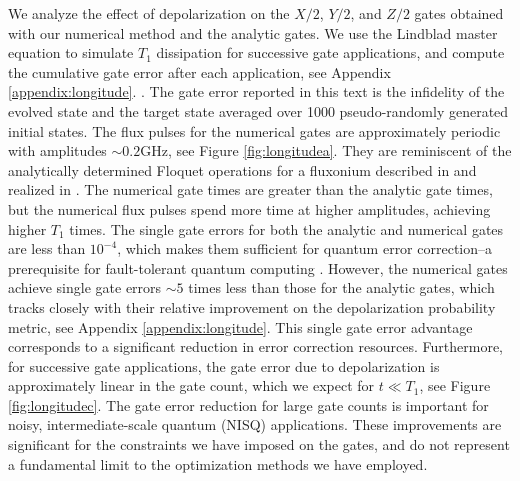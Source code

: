 We analyze the effect of depolarization on
the $X/2$, $Y/2$, and $Z/2$ gates obtained with
our numerical method and the analytic gates. We
use the Lindblad master equation to simulate $T_{1}$ dissipation for successive
gate applications, and compute the cumulative gate error
after each application, see Appendix \ref{appendix:longitude}.
.
The gate error reported in this text is the infidelity
of the evolved state and the target state averaged over 1000 pseudo-randomly
generated initial states.
The flux pulses for the numerical gates
are approximately periodic
with amplitudes $\sim 0.2 \textrm{GHz}$, see Figure \ref{fig:longitudea}.
They are reminiscent of the analytically determined Floquet operations
for a fluxonium described in \cite{huang2020engineering}
and realized in \cite{mundada2020floquet}.
The numerical gate times are greater
than the analytic gate times, but the
numerical flux pulses
spend more time at higher amplitudes, achieving higher $T_{1}$ times.
The single gate errors for both the analytic and numerical gates are
less than $10^{-4}$, which makes them sufficient for quantum error correction--a
prerequisite for fault-tolerant quantum
computing \cite{aharonov2008fault, knill2005quantum, gottesman1997stabilizer}.
However, the numerical gates achieve single gate errors
$\sim 5$ times less than those for the analytic gates,
which tracks closely with their relative improvement
on the depolarization probability metric, see Appendix \ref{appendix:longitude}.
This single gate error advantage corresponds to a significant reduction in error correction resources.
Furthermore, for successive gate applications, the gate error due to depolarization is approximately linear
in the gate count, which we expect for $t \ll T_{1}$, see Figure \ref{fig:longitudec}.
The gate error reduction for large gate counts is important for noisy, intermediate-scale quantum (NISQ)
applications. These improvements are significant for the constraints we have imposed on the gates,
and do not represent a fundamental limit to the optimization methods we have employed.

